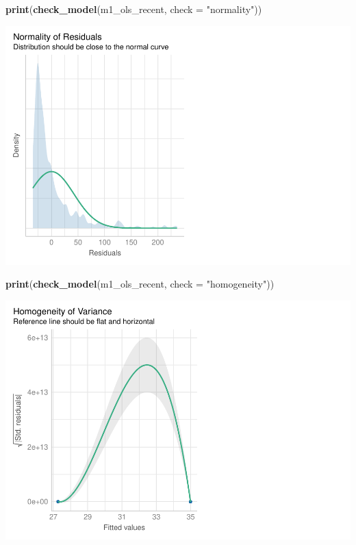 \documentclass[
]{article}
\newenvironment{Shaded}{\begin{snugshade}}{\end{snugshade}}
\newcommand{\AttributeTok}[1]{\textcolor[rgb]{0.13,0.29,0.53}{#1}}
\newcommand{\FunctionTok}[1]{\textcolor[rgb]{0.13,0.29,0.53}{\textbf{#1}}}
\newcommand{\NormalTok}[1]{#1}
\newcommand{\StringTok}[1]{\textcolor[rgb]{0.31,0.60,0.02}{#1}}
\begin{document}
\begin{Shaded}
\begin{Highlighting}[]
\FunctionTok{print}\NormalTok{(}\FunctionTok{check\_model}\NormalTok{(m1\_ols\_recent, }\AttributeTok{check =} \StringTok{"normality"}\NormalTok{))}
\end{Highlighting}
\end{Shaded}

\includegraphics{hw1-lobstrs-eds241_files/figure-latex/unnamed-chunk-32-1.pdf}

\begin{Shaded}
\begin{Highlighting}[]
\FunctionTok{print}\NormalTok{(}\FunctionTok{check\_model}\NormalTok{(m1\_ols\_recent, }\AttributeTok{check =} \StringTok{"homogeneity"}\NormalTok{))}
\end{Highlighting}
\end{Shaded}

\includegraphics{hw1-lobstrs-eds241_files/figure-latex/unnamed-chunk-33-1.pdf}
\end{document}
